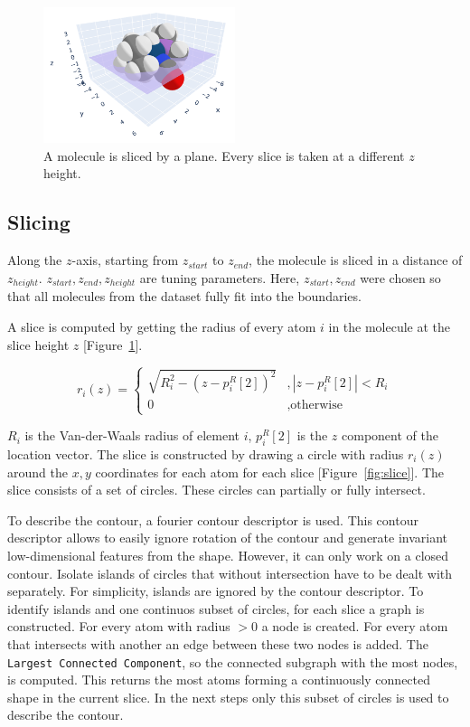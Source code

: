 \begin{figure} [H]
  \centering
  \includegraphics[width=0.5\textwidth]{figures/fourier/slice3D.png} %
  \caption[Slicing a molecule]{A molecule is sliced by a plane. Every slice is taken at a different $z$ height.}
  \label{fig:slice3D}
\end{figure}

\subsection{Slicing}

Along the $z$-axis, starting from $z_{start}$ to $z_{end}$, the molecule is sliced in a distance of $z_{height}$.
$z_{start}, z_{end}, z_{height}$ are tuning parameters.
Here, $z_{start}, z_{end}$ were chosen so that all molecules from the dataset fully fit into the boundaries.

A slice is computed by getting the radius of every atom $i$ in the molecule at the slice height $z$ [Figure~\ref{fig:slice3D}].

$$ r_i(z) =\left\{\begin{array}{ll} \sqrt{R_i^2 - (z - p_i^R[2])^2} &, | z - p_i^R[2] |  < R_i\\
  0 &, \text{otherwise}\end{array}\right.
$$ %

$R_i$ is the Van-der-Waals radius of element $i$, $p_i^R[2]$ is the $z$ component of the location vector.
The slice is constructed by drawing a circle with radius $r_i(z)$ around the $x,y$ coordinates for each atom for each slice [Figure~\ref{fig:slice}].
The slice consists of a set of circles.
These circles can partially or fully intersect. 

To describe the contour, a fourier contour descriptor is used.
This contour descriptor allows to easily ignore rotation of the contour and generate invariant low-dimensional features from the shape.
However, it can only work on a closed contour.
Isolate islands of circles that without intersection have to be dealt with separately.
For simplicity, islands are ignored by the contour descriptor.
To identify islands and one continuos subset of circles, for each slice a graph is constructed.
For every atom with radius $>0$ a node is created.
For every atom that intersects with another an edge between these two nodes is added.
The \texttt{Largest Connected Component}, so the connected subgraph with the most nodes, is computed.
This returns the most atoms forming a continuously connected shape in the current slice.
In the next steps only this subset of circles is used to describe the contour.

